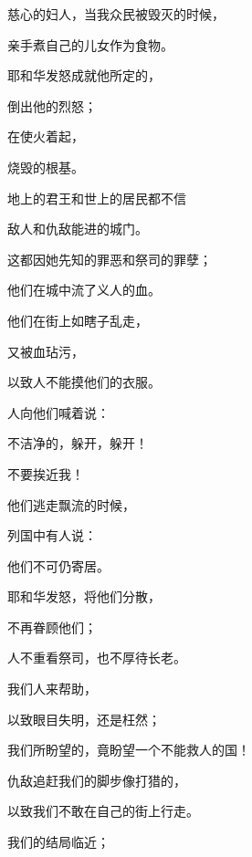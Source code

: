 {\par }{\BB \par }{\Q {}慈心的妇人，当我众民被毁灭的时候，
\par }{\Q 亲手煮自己的儿女作为食物。
\par }{\BB \par }{\Q {}耶和华发怒成就他所定的，
\par }{\Q 倒出他的烈怒；
\par }{\Q 在{}使火着起，
\par }{\Q 烧毁{}的根基。
\par }{\BB \par }{\Q {}地上的君王和世上的居民都不信
\par }{\Q 敌人和仇敌能进{}的城门。
\par }{\BB \par }{\Q {}这都因她先知的罪恶和祭司的罪孽；
\par }{\Q 他们在城中流了义人的血。
\par }{\BB \par }{\Q {}他们在街上如瞎子乱走，
\par }{\Q 又被血玷污，
\par }{\Q 以致人不能摸他们的衣服。
\par }{\BB \par }{\Q {}人向他们喊着说：
\par }{\Q 不洁净的，躲开，躲开！
\par }{\Q 不要挨近我！
\par }{\Q 他们逃走飘流的时候，
\par }{\Q 列国中有人说：
\par }{\Q 他们不可仍{}寄居。
\par }{\BB \par }{\Q {}耶和华发怒，将他们分散，
\par }{\Q 不再眷顾他们；
\par }{\Q 人不重看祭司，也不厚待长老。
\par }{\BB \par }{\Q {}我们{}人来帮助，
\par }{\Q 以致眼目失明，还是枉然；
\par }{\Q 我们所盼望的，竟盼望一个不能救人的国！
\par }{\BB \par }{\Q {}仇敌追赶我们的脚步像打猎的，
\par }{\Q 以致我们不敢在自己的街上行走。
\par }{\Q 我们的结局临近；
}
